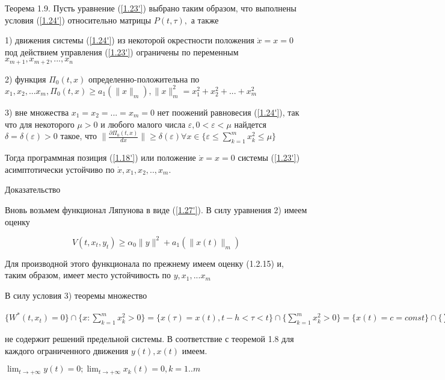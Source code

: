 \begin{theorem}\label{t-1.9}
Теорема 1.9. Пусть уравнение (\ref{1.23'}) выбрано таким образом, что выполнены условия (\ref{1.24'}) относительно матрицы $P(t, \tau),$ а также 

1) движения системы (\ref{1.24'}) из некоторой окрестности положения $\dot x = x= 0$ под действием управления (\ref{1.23'}) ограничены по переменным $x_{m+1}, x_{m+2}, ... , x_n$ 

2) функция $\Pi_0 (t, x)$ определенно-положительна по $x_1, x_2, ... x_m, \Pi_0(t, x) \ge a_1 (\| x \|_m), \| x \|^2_m = x_1^2 + x_2^2 + ... + x_m^2$ 

3) вне множества ${x_1 = x_2 = ... = x_m = 0}$ нет поожений равновесия (\ref{1.24'}), так что для некоторого $\mu > 0$ и любого малого числа  $\varepsilon, 0 < \varepsilon < \mu$ найдется $\delta = \delta(\varepsilon) > 0$ такое, что $\| \frac{\partial \Pi_0 (t, x)}{dx} \| \ge \delta(\varepsilon) \forall x \in \lbrace \varepsilon \le \sum_{k = 1}^{m} x_k^2 \le \mu \rbrace$

Тогда программная позиция (\ref{1.18'}) или положение $\dot x = x = 0$ системы (\ref{1.23'}) асимптотически устойчиво по $\dot x, x_1, x_2,.., x_m.$
\end{theorem}

Доказательство 

Вновь возьмем функционал Ляпунова в виде (\ref{1.27'}). В силу уравнения 2) имеем оценку

\begin{equation}
V(t, x_t, y_t) \ge \alpha_0 \| y \| ^2 + a_1 (\| x(t) \|_m)
\end{equation}

Для производной этого функционала по прежнему имеем оценку (1.2.15) и, таким образом, имеет место устойчивость по $y, x_1, ... x_m$

В силу условия 3) теоремы множество 

$ \lbrace W^{*} (t, x_t) = 0 \rbrace \cap \lbrace x : \sum_{k = 1}^{m} x_k^2 > 0 \rbrace = \lbrace x(\tau) = x(t), t - h < \tau < t \rbrace \cap \lbrace \sum_{k = 1}^{m} x_k^2 > 0 \rbrace = \lbrace x(t) = c = const \rbrace \cap \lbrace \sum_{k = 1}^{m} x_k^2 > 0 \rbrace = \lbrace x: \frac{\partial \Pi^{*} (x)}{\partial x} = 0 \rbrace \cap \lbrace \sum_{k = 1}^{m} x_k^2 > 0 \rbrace$

не содержит решений предельной системы. В соответствие с теоремой 1.8 для каждого ограниченного движения $y(t), x(t)$ имеем.

$\lim_{t \to + \infty} y(t) = 0; \lim_{t \to + \infty} x_k (t) = 0, k = 1..m$

